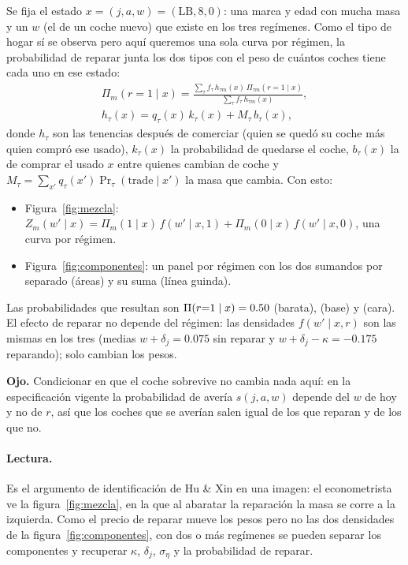 \documentclass{article}
\newcommand{\nota}[1]{\par\smallskip\noindent\colorbox{black!6}{\parbox{\dimexpr\linewidth-2\fboxsep}{\small\textbf{Ojo.} #1}}\par\smallskip}
\begin{document}
Se fija el estado $x=(j,a,w)=(\text{LB},8,0)$: una marca y edad con mucha masa y un $w$ (el de un coche
nuevo) que existe en los tres regímenes. Como el tipo de hogar sí se observa pero aquí queremos una sola
curva por régimen, la probabilidad de reparar junta los dos tipos con el peso de cuántos coches tiene
cada uno en ese estado:
\begin{gather*}
\Pi_m(r{=}1\mid x)=\frac{\sum_\tau f_\tau\,h_{\tau m}(x)\,\Pi_{\tau m}(r{=}1\mid x)}{\sum_\tau f_\tau\,h_{\tau m}(x)},\\
h_{\tau}(x)=q_\tau(x)\,k_\tau(x)+M_\tau\,b_\tau(x),
\end{gather*}
donde $h_\tau$ son las tenencias después de comerciar (quien se quedó su coche más quien compró ese usado),
$k_\tau(x)$ la probabilidad de quedarse el coche, $b_\tau(x)$ la de comprar el usado $x$ entre quienes
cambian de coche y $M_\tau=\sum_{x'} q_\tau(x')\Pr_\tau(\text{trade}\mid x')$ la masa que cambia. Con esto:
\begin{itemize}
\item Figura~\ref{fig:mezcla}: $Z_m(w'\mid x)=\Pi_m(1\mid x)\,f(w'\mid x,1)+\Pi_m(0\mid x)\,f(w'\mid x,0)$, una curva por régimen.
\item Figura~\ref{fig:componentes}: un panel por régimen con los dos sumandos por separado (áreas) y su suma (línea guinda).
\end{itemize}
Las probabilidades que resultan son $\Pi(r{=}1\mid x)=0.50$ (barata), \PiBase{} (base) y
\PiCara{} (cara). El efecto de reparar no depende del régimen: las densidades $f(w'\mid x,r)$ son las mismas en los tres
(medias $w+\delta_j=0.075$ sin reparar y $w+\delta_j-\kappa=-0.175$ reparando); solo cambian los pesos.

\nota{Condicionar en que el coche sobrevive no cambia nada aquí: en la especificación vigente la
probabilidad de avería $s(j,a,w)$ depende del $w$ de hoy y no de $r$, así que los coches que se
averían salen igual de los que reparan y de los que no.}

\paragraph{Lectura.} Es el argumento de identificación de Hu \& Xin en una imagen: el econometrista ve
la figura~\ref{fig:mezcla}, en la que al abaratar la reparación la masa se corre a la izquierda. Como el
precio de reparar mueve los pesos pero no las dos densidades de la figura~\ref{fig:componentes}, con dos
o más regímenes se pueden separar los componentes y recuperar $\kappa$, $\delta_j$, $\sigma_\eta$ y la
probabilidad de reparar.
\end{document}
